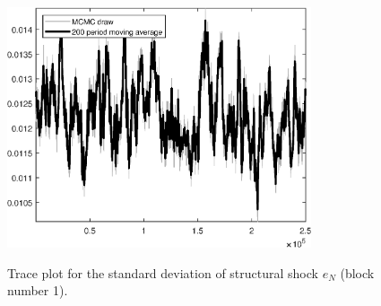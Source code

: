 \begin{figure}[H]
\centering
  \includegraphics[width=0.8\textwidth]{BRS_growth_ext_util/graphs/TracePlot_SE_e_N_blck_1}\\
    \caption{Trace plot for the standard deviation of structural shock ${e_N}$ (block number 1).}
\end{figure}
